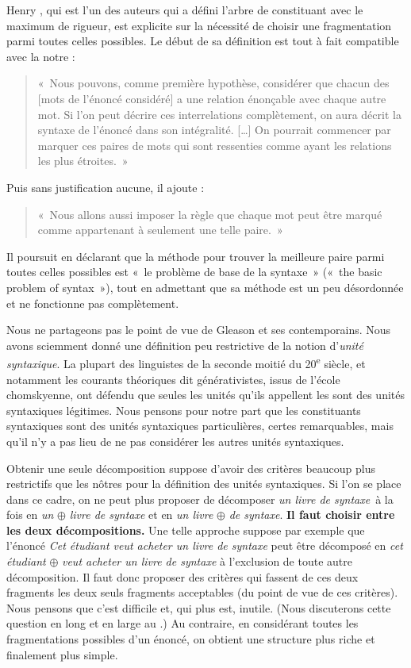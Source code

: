 Henry \citet{gleason1955introduction}, qui est l’un des auteurs qui a défini l’arbre de constituant avec le maximum de rigueur, est explicite sur la nécessité de choisir une fragmentation parmi toutes celles possibles. Le début de sa définition est tout à fait compatible avec la notre : 
\begin{quote}«~Nous pouvons, comme première hypothèse, considérer que chacun des [mots de l’énoncé considéré] a une relation énonçable avec chaque autre mot. Si l’on peut décrire ces interrelations complètement, on aura décrit la syntaxe de l’énoncé dans son intégralité. […] On pourrait commencer par marquer ces paires de mots qui sont ressenties comme ayant les relations les plus étroites.~»\end{quote}
Puis sans justification aucune, il ajoute : 
\begin{quote}«~Nous allons aussi imposer la règle que chaque mot peut être marqué comme appartenant à seulement une telle paire.~»\end{quote}
Il poursuit en déclarant que la méthode pour trouver la meilleure paire parmi toutes celles possibles est «~le problème de base de la syntaxe~» («~the basic problem of syntax~»), tout en admettant que sa méthode est un peu désordonnée et ne fonctionne pas complètement.

Nous ne partageons pas le point de vue de Gleason et ses contemporains. Nous avons sciemment donné une définition peu restrictive de la notion d’\textit{unité syntaxique}. La plupart des linguistes de la seconde moitié du 20\textsuperscript{e} siècle, et notamment les courants théoriques dit générativistes, issus de l’école chomskyenne, ont défendu que seules les unités qu’ils appellent les  sont des unités syntaxiques légitimes. Nous pensons pour notre part que les constituants syntaxiques sont des unités syntaxiques particulières, certes remarquables, mais qu’il n’y a pas lieu de ne pas considérer les autres unités syntaxiques.

Obtenir une seule décomposition suppose d’avoir des critères beaucoup plus restrictifs que les nôtres pour la définition des unités syntaxiques. Si l’on se place dans ce cadre, on ne peut plus proposer de décomposer \textit{un livre de syntaxe}~à la fois en \textit{un} ${\oplus}$ \textit{livre de syntaxe} et en \textit{un livre} ${\oplus}$ \textit{de syntaxe}. \textbf{Il faut choisir entre les deux décompositions.} Une telle approche suppose par exemple que l’énoncé \textit{Cet étudiant veut acheter un livre de syntaxe} peut être décomposé en \textit{cet étudiant} ${\oplus}$ \textit{veut acheter un livre de syntaxe} à l’exclusion de toute autre décomposition. Il faut donc proposer des critères qui fassent de ces deux fragments les deux seuls fragments acceptables (du point de vue de ces critères). Nous pensons que c’est difficile et, qui plus est, inutile. (Nous discuterons cette question en long et en large au .) Au contraire, en considérant toutes les fragmentations possibles d’un énoncé, on obtient une structure plus riche et finalement plus simple.

